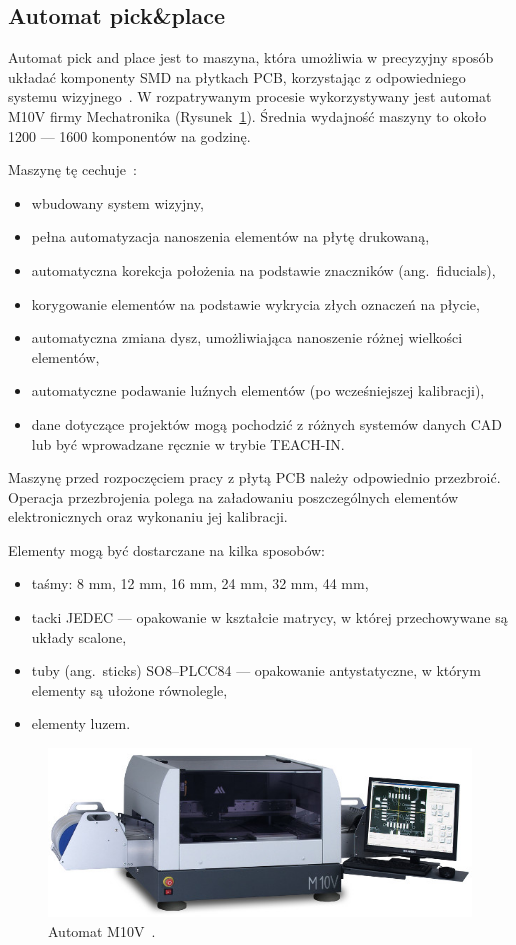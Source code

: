 \subsection{Automat pick\&place}
Automat pick and place jest to maszyna, która umożliwia w precyzyjny sposób układać komponenty SMD na płytkach PCB, korzystając z odpowiedniego systemu wizyjnego~\cite{automatp&p1}. W rozpatrywanym procesie wykorzystywany jest automat M10V firmy Mechatronika (Rysunek~\ref{automat_pick_place}). Średnia wydajność maszyny to około 1200 --- 1600 komponentów na godzinę.

\breakparagraph{}
Maszynę tę cechuje~\cite{automatp&p2}:
\begin{itemize}
	\item wbudowany system wizyjny,
	\item pełna automatyzacja nanoszenia elementów na płytę drukowaną,
	\item automatyczna korekcja położenia na podstawie znaczników (ang.\ fiducials),
	\item korygowanie elementów na podstawie wykrycia złych oznaczeń na płycie,
	\item automatyczna zmiana dysz, umożliwiająca nanoszenie różnej wielkości elementów,
	\item automatyczne podawanie luźnych elementów (po wcześniejszej kalibracji),
	\item dane dotyczące projektów mogą pochodzić z różnych systemów danych CAD lub być wprowadzane ręcznie w trybie TEACH-IN\@.
\end{itemize}

Maszynę przed rozpoczęciem pracy z płytą PCB należy odpowiednio przezbroić. Operacja przezbrojenia polega na załadowaniu poszczególnych elementów elektronicznych oraz wykonaniu jej kalibracji.

\breakparagraph{}
Elementy mogą być dostarczane na kilka sposobów:
\begin{itemize}
	\item taśmy: 8 mm, 12 mm, 16 mm, 24 mm, 32 mm, 44 mm,
	\item tacki JEDEC --- opakowanie w kształcie matrycy, w której przechowywane są układy scalone,
	\item tuby (ang.\ sticks) SO8–PLCC84 --- opakowanie antystatyczne, w którym elementy są ułożone równolegle,
	\item elementy luzem.
\end{itemize}

\begin{figure}[H]
	\centering
	\includegraphics[scale=0.45]{./chapters/chapter2/M10V.jpeg}
	\caption{Automat M10V~\cite{automatp&p2}.}
	\label{automat_pick_place}
\end{figure}


